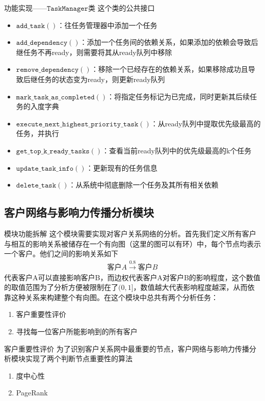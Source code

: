 \documentclass[aspectratio=169]{beamer}
\begin{document}
\begin{frame}{功能实现——$\mathtt{TaskManager}$类}
这个类的公共接口
\begin{itemize}
    \item $\mathtt{add\_task()}$：往任务管理器中添加一个任务
    \item $\mathtt{add\_dependency()}$：添加一个任务间的依赖关系，如果添加的依赖会导致后继任务不再ready，则需要将其从ready队列中移除
    \item $\mathtt{remove\_dependency()}$：移除一个已经存在的依赖关系，如果移除成功且导致后继任务的状态变为ready，则更新ready队列
    \item $\mathtt{mark\_task\_as\_completed()}$：将指定任务标记为已完成，同时更新其后续任务的入度字典
    \item $\mathtt{execute\_next\_highest\_priority\_task()}$：从ready队列中提取优先级最高的任务，并执行
    \item $\mathtt{get\_top\_k\_ready\_tasks()}$：查看当前ready队列中的优先级最高的k个任务
    \item $\mathtt{update\_task\_info()}$：更新现有的任务信息
    \item $\mathtt{delete\_task()}$：从系统中彻底删除一个任务及其所有相关依赖
\end{itemize}
\end{frame}

\subsection{客户网络与影响力传播分析模块}
\begin{frame}{模块功能拆解}
    这个模块需要实现对客户关系网络的分析。首先我们定义所有客户与相互的影响关系被储存在一个有向图（这里的图可以有环）中，每个节点均表示一个客户。他们之间的影响关系如下
\begin{align*}
    \text{客户}A \overset{0.8}{\longrightarrow} \text{客户}B
\end{align*}
代表客户A可以直接影响客户B，而边权代表客户A对客户B的影响程度，这个数值的取值范围为了分析方便被限制在了$(0,1]$，数值越大代表影响程度越深，从而依靠这种关系来构建整个有向图。在这个模块中总共有两个分析任务：
\begin{enumerate}
    \item 客户重要性评价
    \item 寻找每一位客户所能影响到的所有客户
\end{enumerate}
\end{frame}

\begin{frame}{客户重要性评价}
    为了识别客户关系网中最重要的节点，客户网络与影响力传播分析模块实现了两个判断节点重要性的算法
    \begin{enumerate}
        \item 度中心性
        \item PageRank
    \end{enumerate}
\end{frame}
\end{document}
